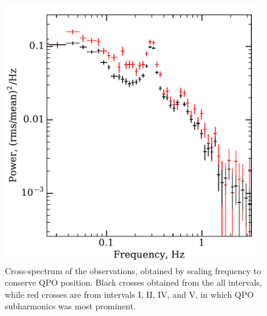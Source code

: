 \documentclass[a4paper,fleqn,usenatbib]{mnras}
\begin{document}
\begin{figure}
        \includegraphics[width=\columnwidth]{folded_cospectr2.pdf}
        \caption{Cross-spectrum of the observations, obtained by scaling frequency to conserve QPO position.
        Black crosses obtained from the all intervals, while red crosses are from intervals I, II, IV, and V, in which QPO subharmonics was most prominent.}
        \label{fig:cospec_tracked}
\end{figure}
\end{document}
